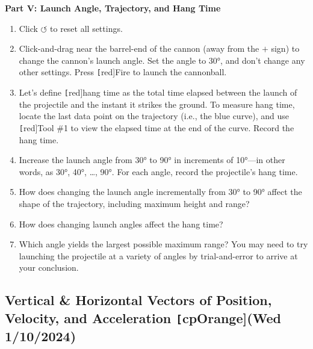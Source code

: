 \documentclass[main-physics.tex]{subfiles}
\begin{document}
\vspace{1em}

\clearpage

\textbf{Part V: Launch Angle, Trajectory, and Hang Time}

\begin{enumerate}
    \item Click $\boldsymbol{\circlearrowleft}$ to reset all settings.
    \item Click-and-drag near the barrel-end of the cannon (away from the $\boldsymbol{+}$ sign) to change the cannon's launch angle. Set the angle to \ang{30}, and don't change any other settings. Press \texttt[red]{Fire} to launch the cannonball. 
    \item Let's define \texttt[red]{hang time} as the total time elapsed between the launch of the projectile and the instant it strikes the ground. To measure hang time, locate the last data point on the trajectory (i.e., the blue curve), and use \texttt[red]{Tool \#1} to view the elapsed time at the end of the curve. Record the hang time.
    \item Increase the launch angle from \ang{30} to \ang{90} in increments of \ang{10}---in other words, as \ang{30}, \ang{40}, \ldots, \ang{90}. For each angle, record the projectile's hang time.
    \item How does changing the launch angle incrementally from \ang{30} to \ang{90} affect the shape of the trajectory, including maximum height and range?
    \item How does changing launch angles affect the hang time?  
    \item Which angle yields the largest possible maximum range? You may need to try launching the projectile at a variety of angles by trial-and-error to arrive at your conclusion.
\end{enumerate}

\subsection{Vertical \& Horizontal Vectors of Position, Velocity, and Acceleration \texttt[cpOrange]{(Wed 1/10/2024)}} \label{tMF7JY}
\end{document}
